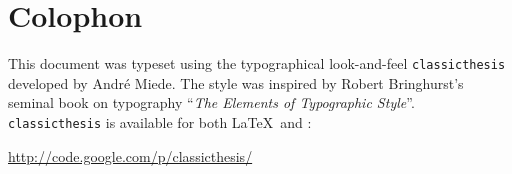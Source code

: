 
\pagestyle{empty}

\hfill

\vfill


\section*{Colophon}

This document was typeset using the typographical look-and-feel \texttt{classicthesis} developed by Andr\'e Miede. The style was inspired by Robert Bringhurst's seminal book on typography ``\emph{The Elements of Typographic Style}''. \texttt{classicthesis} is available for both \LaTeX\ and \mLyX: 

\begin{center}
\url{http://code.google.com/p/classicthesis/}
\end{center}

 
\bigskip

\noindent\finalVersionString